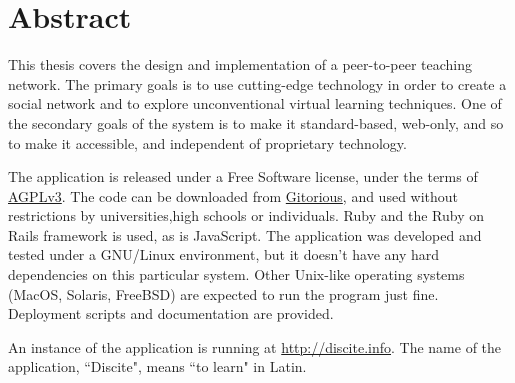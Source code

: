 \section*{Abstract}
This thesis covers the design and implementation of a peer-to-peer teaching
network. The primary goals is to use cutting-edge technology in order to create
a social network and to explore unconventional virtual learning techniques.
One of the secondary goals of the system is to make it standard-based, web-only,
and so to make it accessible, and independent of proprietary technology.

The application is released under a Free Software license, under the terms of
\href{http://www.gnu.org/licenses/agpl-3.0.html}{AGPLv3}. The code can be
downloaded from \href{https://gitorious.org/discite/discite/}{Gitorious}, and
used without restrictions by universities,high schools or individuals. Ruby and
the Ruby on Rails framework is used, as is JavaScript. The application was
developed and tested under a GNU/Linux environment, but it doesn't have any hard
dependencies on this particular system. Other Unix-like operating systems (MacOS,
Solaris, FreeBSD) are expected to run the program just fine. Deployment scripts
and documentation are provided.

An instance of the application is running at \url{http://discite.info}. The
name of the application, ``Discite", means ``to learn" in Latin.
\clearpage
